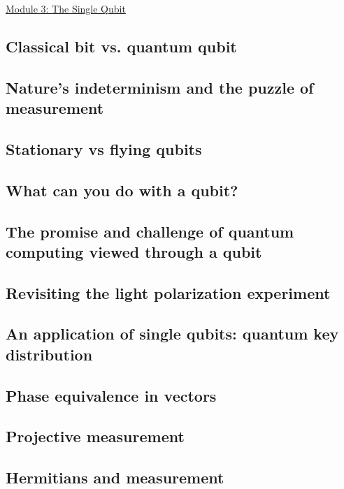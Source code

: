 \documentclass[main.tex]{subfiles}
\begin{document}
\href{https://www2.seas.gwu.edu/~simhaweb/quantum/modules/module3/module3.html}{Module 3: The Single Qubit}

\subsection{Classical bit vs. quantum qubit}

\subsection{Nature's indeterminism and the puzzle of measurement}

\subsection{Stationary vs flying qubits}

\subsection{What can you do with a qubit?}

\subsection{The promise and challenge of quantum computing viewed through a qubit}

\subsection{Revisiting the light polarization experiment}

\subsection{An application of single qubits: quantum key distribution}

\subsection{Phase equivalence in vectors}

\subsection{Projective measurement}

\subsection{Hermitians and measurement}
\end{document}
